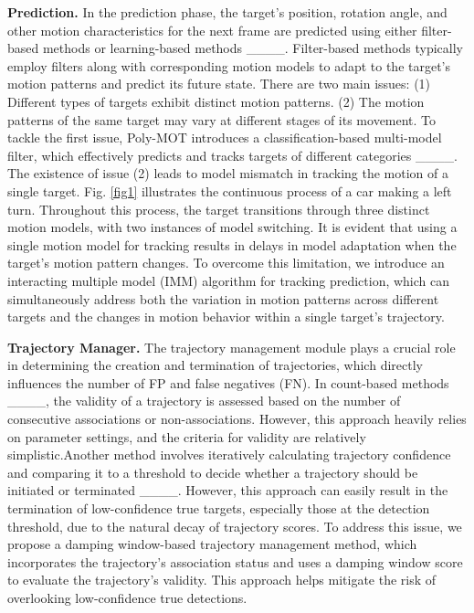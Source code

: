 \textbf{Prediction.} In the prediction phase, the target's position, rotation angle, and other motion characteristics for the next frame are predicted using either  filter-based methods or  learning-based methods ____. Filter-based methods typically employ filters along with corresponding motion models to adapt to the target's motion patterns and predict its future state. There are two main issues: (1) Different types of targets exhibit distinct motion patterns. (2) The motion patterns of the same target may vary at different stages of its movement. To tackle the first issue, Poly-MOT introduces a classification-based multi-model filter, which effectively predicts and tracks targets of different categories ____. The existence of issue (2) leads to model mismatch in tracking the motion of a single target.
Fig. \ref{fig1} illustrates the continuous process of a car making a left turn. Throughout this process, the target transitions through three distinct motion models, with two instances of model switching. It is evident that using a single motion model for tracking results in delays in model adaptation when the target's motion pattern changes. To overcome this limitation, we introduce an interacting multiple model (IMM) algorithm for tracking prediction, which can simultaneously address both the variation in motion patterns across different targets and the changes in motion behavior within a single target's trajectory.

\textbf{Trajectory Manager.} The trajectory management module plays a crucial role in determining the creation and termination of trajectories, which directly influences the number of FP and false negatives (FN). In count-based methods ____, the validity of a trajectory is assessed based on the number of consecutive associations or non-associations. However, this approach heavily relies on parameter settings, and the criteria for validity are relatively simplistic.Another method involves iteratively calculating trajectory confidence and comparing it to a threshold to decide whether a trajectory should be initiated or terminated ____. However, this approach can easily result in the termination of low-confidence true targets, especially those at the detection threshold, due to the natural decay of trajectory scores. To address this issue, we propose a damping window-based trajectory management method, which incorporates the trajectory's association status and uses a damping window score to evaluate the trajectory's validity. This approach helps mitigate the risk of overlooking low-confidence true detections.
